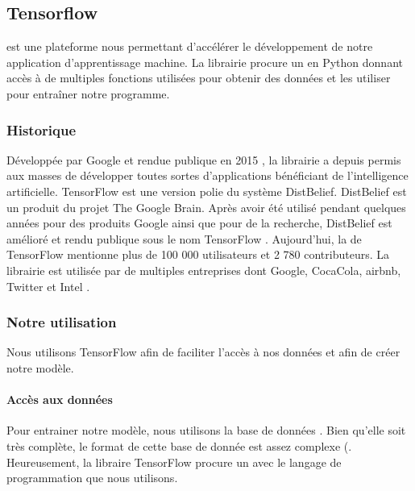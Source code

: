 \documentclass[letterpaper,10pt,french]{sphinxmanual}
\begin{document}
\subsection{Tensorflow}
\label{\detokenize{explications_librairies:tensorflow}}
 est une plateforme nous permettant d’accélérer
le développement de notre application d’apprentissage machine. La librairie
procure un  en Python donnant accès
à de multiples fonctions utilisées pour obtenir des données et les utiliser
pour entraîner notre programme.


\subsubsection{Historique}
\label{\detokenize{explications_librairies:historique}}
Développée par Google et rendue publique en 2015 , la librairie
a depuis permis aux masses de développer toutes sortes d’applications
bénéficiant de l’intelligence artificielle. TensorFlow est une version polie
du système DistBelief. DistBelief est un produit du projet The Google Brain.
Après avoir été utilisé pendant quelques années pour des produits Google ainsi
que pour de la recherche, DistBelief est amélioré et rendu publique sous le
nom TensorFlow . Aujourd’hui, la
 de TensorFlow mentionne
plus de 100 000 utilisateurs et 2 780 contributeurs. La librairie est utilisée
par de multiples entreprises dont Google, Coca\sphinxhyphen{}Cola, airbnb, Twitter et Intel
.


\subsubsection{Notre utilisation}
\label{\detokenize{explications_librairies:notre-utilisation}}
Nous utilisons TensorFlow afin de faciliter l’accès à nos données et afin
de créer notre modèle.


\paragraph{Accès aux données}
\label{\detokenize{explications_librairies:acces-aux-donnees}}
Pour entrainer notre modèle, nous utilisons la base de données
. Bien qu’elle soit très complète,
le format de cette base de donnée est assez complexe
({\hyperref[\detokenize{preprocessing::doc}]{}}. Heureusement,
la libraire TensorFlow procure un
avec le langage de programmation que nous utilisons.
\end{document}
